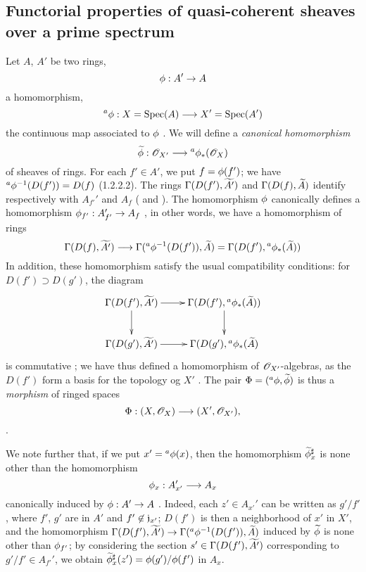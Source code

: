 \subsection{Functorial properties of quasi-coherent sheaves over a prime spectrum}
\label{subsection-func-qcoh-over-spec}

\begin{env}[1.6.1]
\label{1.1.6.1}
Let $A$, $A'$ be two rings,
\[
  \phi:A'\to A
\]
a homomorphism,
\[
  {}^a\phi:X={\mathop{\mathrm{Spec}}\nolimits}(A)\longrightarrow X'={\mathop{\mathrm{Spec}}\nolimits}(A')
\]
the continuous map associated to $\phi$ . We will define a \emph{canonical
homomorphism}
\[
  \widetilde{\phi}:\mathscr{O}_{X'}\longrightarrow{}^a\phi_*(\mathscr{O}_X)
\]
of sheaves of rings. For each $f'\in A'$, we put $f=\phi(f')$; we have
${}^a\phi^{-1}(D(f'))=D(f)$ (1.2.2.2). The rings $\Gamma(D(f'),\widetilde{A'})$ and
$\Gamma(D(f),\widetilde{A})$ identify respectively with $A_{f'}'$ and $A_f$
( and ). The homomorphism $\phi$ canonically defines a
homomorphism $\phi_{f'}:A_{f'}'\to A_f$ , in other words, we have a
homomorphism of rings
\[
  \Gamma(D(f),\widetilde{A'})\longrightarrow\Gamma({}^a\phi^{-1}(D(f')),\widetilde{A})
  =\Gamma(D(f'),{}^a\phi_*(\widetilde{A}))
\]
In addition, these homomorphism satisfy the usual compatibility conditions: for
$D(f')\supset D(g')$, the diagram
\[
  \xymatrix{
    \Gamma(D(f'),\wt{A'})\ar[r]\ar[d] &
    \Gamma(D(f'),{}^a\vphi_*(\wt{A}))\ar[d]\\
    \Gamma(D(g'),\wt{A'})\ar[r] &
    \Gamma(D(g'),{}^a\vphi_*(\wt{A})
  }
\]
is commutative ; we have thus defined a homomorphism of $\mathscr{O}_{X'}$-algebras,
as the $D(f')$ form a basis for the topology og $X'$ . The pair
$\Phi=({}^a\phi,\widetilde{\phi})$ is thus a \emph{morphism} of ringed spaces
\[
  \Phi:(X,\mathscr{O}_X)\longrightarrow(X',\mathscr{O}_{X'}),
\]
.

We note further that, if we put $x'={}^a\phi(x)$, then the homomorphism
$\widetilde{\phi}_x^\sharp$  is none other than the homomorphism
\[
  \phi_x:A_{x'}'\longrightarrow A_x
\]
canonically induced by $\phi:A'\to A$ . Indeed, each $z'\in A_{x'}'$
can be written as $g'/f'$, where $f'$, $g'$ are in $A'$ and $f'\not\in\mathfrak{j}_{x'}$;
$D(f')$ is then a neighborhood of $x'$ in $X'$, and the homomorphism
$\Gamma(D(f'),\widetilde{A'})\to\Gamma({}^a\phi^{-1}(D(f')),\widetilde{A})$ induced by
$\widetilde{\phi}$ is none other than $\phi_{f'}$; by considering the section
$s'\in\Gamma(D(f'),\widetilde{A'})$ corresponding to $g'/f'\in A_{f'}'$, we obtain
$\widetilde{\phi}_x^\sharp(z')=\phi(g')/\phi(f')$ in $A_x$.
\end{env}

